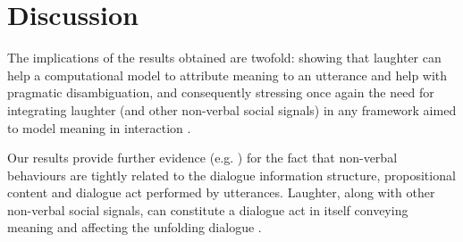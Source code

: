 \documentclass[11pt,a4paper]{article}
\begin{document}


\section{Discussion}
\label{sec:discussion}
The implications of the results obtained are twofold: showing that
laughter can help a computational model to attribute meaning to an
utterance and help with pragmatic disambiguation, and consequently
stressing once again the need for integrating laughter (and other
non-verbal social signals) in any framework aimed to model meaning in
interaction \citep{ginzburg2020laughter,Maraev.Mazzocconi.Howes.Ginzburg_ISCA_2018}. %


Our results provide further evidence
(e.g. \citet{torres1997modeling,gazelaughter}) for the fact that
non-verbal behaviours are tightly related to the dialogue information
structure, propositional content and  dialogue act performed by
utterances.
Laughter, along with other non-verbal social signals, can constitute a
dialogue act in itself conveying meaning and affecting the unfolding
 dialogue \citep{bavelas2000visible,ginzburg2020laughter}.
\end{document}
